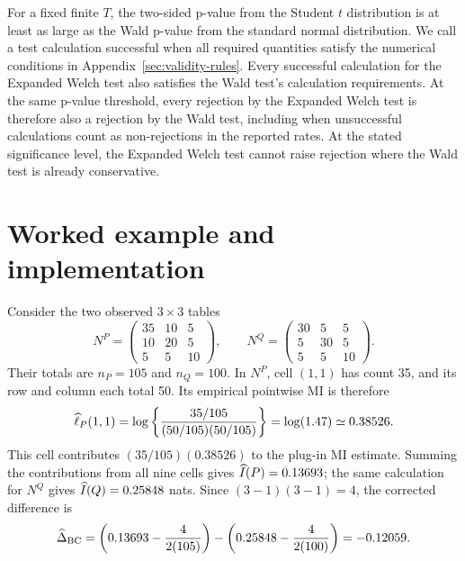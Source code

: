 For a fixed finite \(T\), the two-sided p-value from the Student \(t\)
distribution is at least as large as the Wald p-value from the standard
normal distribution.
We call a test calculation successful when all required quantities satisfy
the numerical conditions in Appendix~\ref{sec:validity-rules}. Every
successful calculation for the Expanded Welch test also satisfies the Wald test's
calculation requirements. At the same p-value threshold, every rejection by the
Expanded Welch test is therefore also a rejection by the Wald test, including when unsuccessful calculations
count as non-rejections in the reported rates. At the stated significance
level, the Expanded Welch test cannot raise rejection where the Wald test is already
conservative.

\section{Worked example and implementation}

Consider the two observed \(3\times3\) tables
\begin{equation}
  N^P=
  \begin{pmatrix}
  35&10&5\\
  10&20&5\\
  5&5&10
  \end{pmatrix},
  \qquad
  N^Q=
  \begin{pmatrix}
  30&5&5\\
  5&30&5\\
  5&5&10
  \end{pmatrix}.
  \label{eq:worked-tables}
\end{equation}
Their totals are \(n_P=105\) and \(n_Q=100\). In \(N^P\), cell
\((1,1)\) has count 35, and its row and column each total 50. Its empirical
pointwise MI is therefore
\begin{equation*}
 \widehat{\ell}_P(1,1)
 =\log\left\{\frac{35/105}{(50/105)(50/105)}\right\}
 =\log(1.47)\simeq0.38526.
\end{equation*}
This cell contributes \((35/105)(0.38526)\) to the plug-in MI estimate.
Summing the contributions from all nine cells gives
\(\widehat I(P)=0.13693\); the same calculation for \(N^Q\) gives
\(\widehat I(Q)=0.25848\) nats. Since \((3-1)(3-1)=4\), the corrected difference is
\begin{equation}
  \widehat\Delta_{\mathrm{BC}}
  =\left(0.13693-\frac{4}{2(105)}\right)
  -\left(0.25848-\frac{4}{2(100)}\right)
  =-0.12059.
\end{equation}


